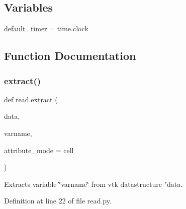 \subsection*{Variables}
\begin{DoxyCompactItemize}
\item 
\hyperlink{namespaceread_a0ffc2818a4b9a8753985d1fd9095e02f}{default\+\_\+timer} = time.\+clock
\end{DoxyCompactItemize}


\subsection{Function Documentation}
\mbox{\label{namespaceread_a565fbd6a03d2869132df93c79903a6d4}} 
\subsubsection{\texorpdfstring{extract()}{extract()}}
{\footnotesize\ttfamily def read.\+extract (\begin{DoxyParamCaption}\item[{}]{data,  }\item[{}]{varname,  }\item[{}]{attribute\+\_\+mode = {\ttfamily \textquotesingle{}cell\textquotesingle{}} }\end{DoxyParamCaption})}



Extracts variable \char`\"{}varname\char`\"{} from vtk datastructure "data\textquotesingle{}. 



Definition at line 22 of file read.\+py.


